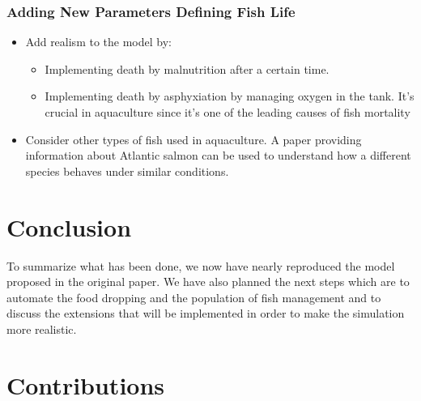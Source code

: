 \documentclass[9pt]{pnas-new}
\begin{document}
\small\subsubsection*{Adding New Parameters Defining Fish Life}
\begin{itemize}
    \item Add realism to the model by:
        \begin{itemize}
            \item Implementing death by malnutrition after a certain time.
            \item Implementing death by asphyxiation by managing oxygen in the tank. It's crucial in aquaculture since it's one of the leading causes of fish mortality
        \end{itemize}
    \item Consider other types of fish used in aquaculture. A paper providing information about Atlantic salmon \cite{handeland2008effect} can be used to understand how a different species behaves under similar conditions.
\end{itemize}




\section{Conclusion }
To summarize what has been done, we now have nearly reproduced the model proposed in the original paper. We have also planned the next steps which are to automate the food dropping and the population of fish management and to discuss the extensions that will be implemented in order to make the simulation more realistic.

\section{Contributions}

    

\begin{multicols}{2}
\section*{\bibname}

\end{multicols}
\end{document}

